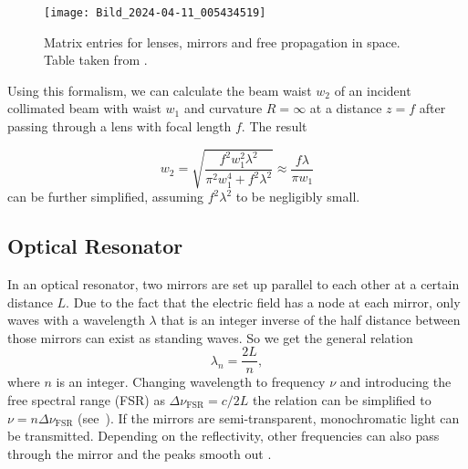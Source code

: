 \begin{figure}[H]
	\centering
	\texttt{[image: Bild\_2024-04-11\_005434519]}
	\caption{Matrix entries for lenses, mirrors and free propagation in space. Table taken from \autocite{gaussian_beam_script}.}
	\label{fig:matrix_optics_table}
\end{figure}

Using this formalism, we can calculate the beam waist $w_2$ of an incident collimated beam with waist $w_1$ and curvature $R = \infty$ at a distance $z = f$ after passing through a lens with focal length $f$. The result

\begin{equation}\label{eqn:w2}
	 w_2 = \sqrt{\frac{f^2w_1^2\lambda^2}{\pi^2w_1^4 + f^2\lambda^2}} \approx \frac{f\lambda}{\pi w_1}
\end{equation}
can be further simplified, assuming $f^2\lambda^2$ to be negligibly small.

\subsection{Optical Resonator}
\label{subsec:OptRes}
In an optical resonator, two mirrors are set up parallel to each other at a certain distance $L$. Due to the fact that the electric field has a node at each mirror, only waves with a wavelength $\lambda$ that is an integer inverse of the half distance between those mirrors can exist as standing waves. So we get the general relation
$$\lambda_n=\frac{2 L}{n}, $$ 
where $n$ is an integer. Changing wavelength to frequency $\nu$ and introducing the free spectral range (FSR) as $\Delta \nu_{\mathrm{FSR}}= c/2L$ the relation can be simplified to $\nu=n\Delta \nu_{\mathrm{FSR}}$ (see~\autocite{diodenlaser}).
If the mirrors are semi-transparent, monochromatic light can be transmitted. Depending on the reflectivity, other frequencies can also pass through the mirror and the peaks smooth out \autocite{Fabry-Perot_Interferometer_Tutorial}. 



